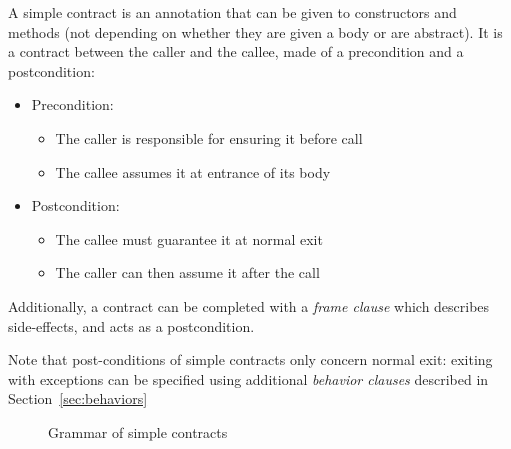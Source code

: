 \documentclass[a4paper,11pt,twoside,openright]{report}
\begin{document}
A simple contract is an annotation that can be given to constructors
and methods (not depending on whether they are given a body or are
abstract). It is a contract between the caller and the callee, made of
a precondition and a postcondition:
\begin{itemize}
\item Precondition:
  \begin{itemize}
  \item The caller is responsible for ensuring it before call
  \item The callee assumes it at entrance of its body
  \end{itemize}
\item Postcondition:
  \begin{itemize}
  \item The callee must guarantee it at normal exit
  \item The caller can then assume it after the call
  \end{itemize}
\end{itemize}
Additionally, a contract can be completed with a \emph{frame clause}
which describes side-effects, and acts as a postcondition. 

Note that post-conditions of simple contracts only concern normal
exit: exiting with exceptions can be specified using additional
\emph{behavior clauses} described in Section~\ref{sec:behaviors}

\begin{figure}[t]
    \caption{Grammar of simple contracts}
  \label{fig:gram:contracts}
\end{figure}
\end{document}
